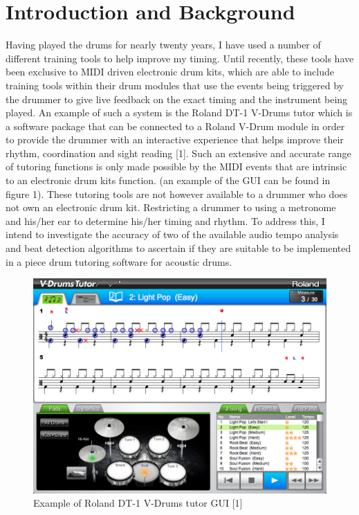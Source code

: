 \documentclass[a4paper, 11pt]{article}
\begin{document}
\maketitle{} \section{Introduction and Background}
Having played the drums for nearly twenty years, I have used a number of different training tools to help improve my timing. Until recently, these tools have been exclusive to MIDI driven electronic drum kits, which are able to include training tools within their drum modules that use the events being triggered by the drummer to give live feedback on the exact timing and the instrument being played. An example of such a system is the Roland DT-1 V-Drums tutor which is a software package that can be connected to a Roland V-Drum module in order to provide the drummer with an interactive experience that helps improve their rhythm, coordination and sight reading [1]. Such an extensive and accurate range of tutoring functions is only made possible by the MIDI events that are intrinsic to an electronic drum kits function. (an example of the GUI can be found in figure 1). These tutoring tools are not however available to a drummer who does not own an electronic drum kit. Restricting a drummer to using a metronome and his/her ear to determine his/her timing and rhythm. To address this, I intend to investigate the accuracy of two of the available audio tempo analysis and beat detection algorithms to ascertain if they are suitable to be implemented in a piece drum tutoring software for acoustic drums.
\begin{figure}[h]
\caption{Example of Roland DT-1 V-Drums tutor GUI [1]}
	\centering
	\includegraphics[scale=0.25]{dt-1_ss_main_notation_gal}
\end{figure}
\end{document}
